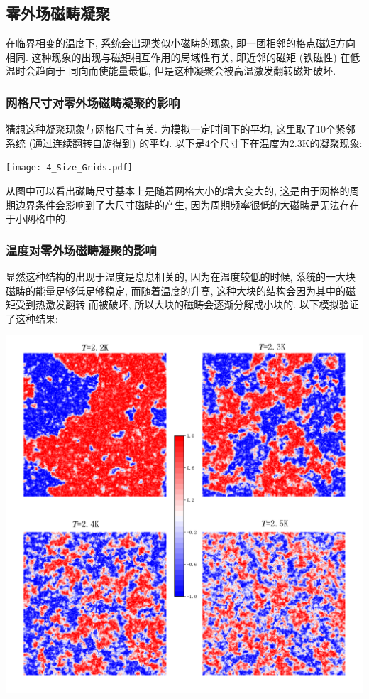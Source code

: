 \documentclass[UTF8]{ctexart}
\begin{document}
        \subsection{零外场磁畴凝聚}
            \indent 在临界相变的温度下, 系统会出现类似小磁畴的现象, 即一团相邻的格点磁矩方向相同. 这种现象的出现与磁矩相互作用的局域性有关, 即近邻的磁矩 (铁磁性) 在低温时会趋向于
            同向而使能量最低, 但是这种凝聚会被高温激发翻转磁矩破坏.
            \subsubsection{网格尺寸对零外场磁畴凝聚的影响}
                \indent 猜想这种凝聚现象与网格尺寸有关. 为模拟一定时间下的平均, 这里取了10个紧邻系统 (通过连续翻转自旋得到) 的平均. 以下是4个尺寸下在温度为2.3K的凝聚现象:
                \begin{center}
                    \texttt{[image: 4\_Size\_Grids.pdf]}
                \end{center}
                从图中可以看出磁畴尺寸基本上是随着网格大小的增大变大的, 这是由于网格的周期边界条件会影响到了大尺寸磁畴的产生, 因为周期频率很低的大磁畴是无法存在于小网格中的.
                \newpage
            \subsubsection{温度对零外场磁畴凝聚的影响}
                \indent 显然这种结构的出现于温度是息息相关的, 因为在温度较低的时候, 系统的一大块磁畴的能量足够低足够稳定, 而随着温度的升高, 这种大块的结构会因为其中的磁矩受到热激发翻转
                而被破坏, 所以大块的磁畴会逐渐分解成小块的. 以下模拟验证了这种结果:
                \begin{center}
                    \includegraphics[width=17cm]{4_T_Grids.pdf}
                \end{center}
                \newpage
\end{document}
